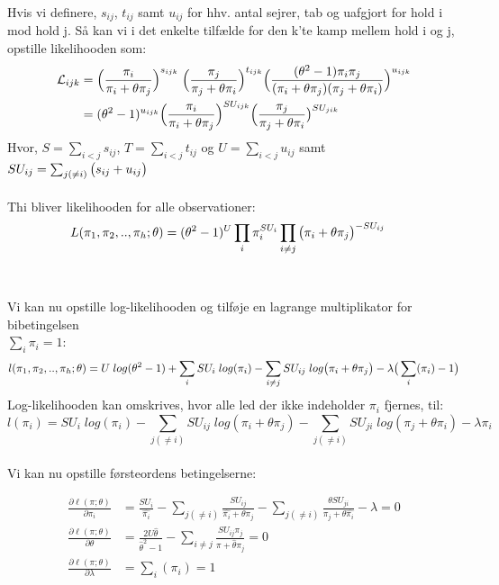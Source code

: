 \documentclass[11pt,a4paper]{article}
\begin{document}
Hvis vi definere, $s_{ij}$, $t_{ij}$ samt $u_{ij}$ for hhv. antal sejrer, tab og uafgjort for hold i mod hold j. Så kan vi i det enkelte tilfælde for den k'te kamp mellem hold i og j, opstille likelihooden som: 
\begin{align*}
\mathcal{L}_{ijk} &= \Big{(}\frac{\pi_i}{\pi_i+\theta\pi_j}\Big{)}^{s_{ijk}}
\;\Big{(}\frac{\pi_j}{\pi_j+\theta\pi_i}\Big{)}^{t_{ijk}}
\Big{(}\frac{(\theta^2-1)\pi_i \pi_j}{(\pi_i+\theta\pi_j)(\pi_j+\theta\pi_i)}\Big{)}^{u_{ijk}}\\
&= (\theta^2-1)^{u_{ijk}}\Big{(}\frac{\pi_i}{\pi_i+\theta\pi_j}\Big{)}^{SU_{ijk}}\Big{(}\frac{\pi_j}{\pi_j+\theta\pi_i}\big{)}^{SU_{jik}}
\end{align*}
Hvor, $S=\sum_{i<j}s_{ij}$,  $T=\sum_{i<j}t_{ij}$ og $U=\sum_{i<j}u_{ij}$ samt $SU_{ij}=\sum_{j(\neq i)}\big{(}s_{ij}+u_{ij}\big{)}$ \\
\\
Thi bliver likelihooden for alle observationer:
\begin{align*}
L(\pi_1,\pi_2,..,\pi_h;\theta) &=(\theta^2-1)^U\prod_i\pi_i^{SU_i}\prod_{i\neq j}\big{(}\pi_i+\theta\pi_j\big{)}^{-SU_{ij}}
\end{align*}
\\\\
Vi kan nu opstille log-likelihooden og tilføje en lagrange multiplikator for bibetingelsen\\ $\sum_i\pi_i=1$:
\begin{align*}
l(\pi_1,\pi_2,..,\pi_h;\theta) 
&=U\;log(\theta^2-1)+\sum_i SU_{i}\;log(\pi_i)-\sum_{i \neq j}SU_{ij}\;log\big{(}\pi_i+\theta \pi_j\big{)}-\lambda\big{(}\sum_i(\pi_i)-1\big{)}\\
\end{align*}
Log-likelihooden kan omskrives, hvor alle led der ikke indeholder $\pi_i$ fjernes, til:
$$l(\pi_i)=SU_i \; log(\pi_i) - \sum_{j(\neq i)}SU_{ij}\;log(\pi_i + \theta \pi_j) - \sum_{j(\neq i)} SU_{ji}\; log(\pi_j + \theta \pi_i)-\lambda \pi_i$$
\\
Vi kan nu opstille førsteordens betingelserne: 
\begin{equations}
\begin{align}
 \frac{\partial \ell(\pi;\theta)}{\partial \pi_i}&= 
\frac{SU_i}{\hat{\pi_i}}-\sum_{j(\neq i)}\frac{SU_{ij}}{\hat{\pi_i}+\theta \pi_j}-\sum_{j(\neq i)}\frac{\theta SU_{ji}}{\pi_j + \theta \hat{\pi_i}}-\lambda=0\\
\frac{\partial \ell(\pi;\theta)}{\partial \theta}&=
\frac{2U\hat{\theta}}{\hat{\theta}^2-1}-\sum_{i \neq j}\frac{SU_{ij}\pi_j}{\pi+\hat{\theta}\pi_j}=0\\
\frac{\partial \ell(\pi;\theta)}{\partial \lambda}&=
\sum_i(\pi_i)=1
\end{align}
\end{equations}
\end{document}
